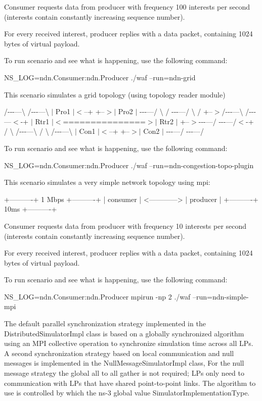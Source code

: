 Consumer requests data from producer with frequency 100 interests per second (interests contain constantly increasing sequence number).

For every received interest, producer replies with a data packet, containing 1024 bytes of virtual payload.

To run scenario and see what is happening, use the following command\+: \begin{DoxyVerb}NS_LOG=ndn.Consumer:ndn.Producer ./waf --run=ndn-grid\end{DoxyVerb}


This scenario simulates a grid topology (using topology reader module)

/-\/-\/-\/---\textbackslash{} /-\/-\/-\/---\textbackslash{} $\vert$ Pro1 $\vert$$<$--+ +--$>$$\vert$ Pro2 $\vert$ -\/-\/-\/---/ \textbackslash{} / -\/-\/-\/---/ \textbackslash{} / +--$>$/-\/-\/-\/---\textbackslash{} /-\/-\/-\/---$<$-\/+ $\vert$ Rtr1 $\vert$$<$===============$>$$\vert$ Rtr2 $\vert$ +--$>$-\/-\/-\/---/ -\/-\/-\/---/$<$-\/+ / \textbackslash{} /-\/-\/-\/---\textbackslash{} / \textbackslash{} /-\/-\/-\/---\textbackslash{} $\vert$ Con1 $\vert$$<$--+ +--$>$$\vert$ Con2 $\vert$ -\/-\/-\/---/ -\/-\/-\/---/

To run scenario and see what is happening, use the following command\+: \begin{DoxyVerb}NS_LOG=ndn.Consumer:ndn.Producer ./waf --run=ndn-congestion-topo-plugin\end{DoxyVerb}


This scenario simulates a very simple network topology using mpi\+:

\begin{DoxyVerb} +----------+     1 Mbps     +----------+
 | consumer | <------------> | producer |
 +----------+      10ms      +----------+
\end{DoxyVerb}


Consumer requests data from producer with frequency 10 interests per second (interests contain constantly increasing sequence number).

For every received interest, producer replies with a data packet, containing 1024 bytes of virtual payload.

To run scenario and see what is happening, use the following command\+: \begin{DoxyVerb}NS_LOG=ndn.Consumer:ndn.Producer mpirun -np 2 ./waf --run=ndn-simple-mpi
\end{DoxyVerb}


The default parallel synchronization strategy implemented in the Distributed\+Simulator\+Impl class is based on a globally synchronized algorithm using an M\+PI collective operation to synchronize simulation time across all L\+Ps. A second synchronization strategy based on local communication and null messages is implemented in the Null\+Message\+Simulator\+Impl class, For the null message strategy the global all to all gather is not required; L\+Ps only need to communication with L\+Ps that have shared point-\/to-\/point links. The algorithm to use is controlled by which the ns-\/3 global value Simulator\+Implementation\+Type.

